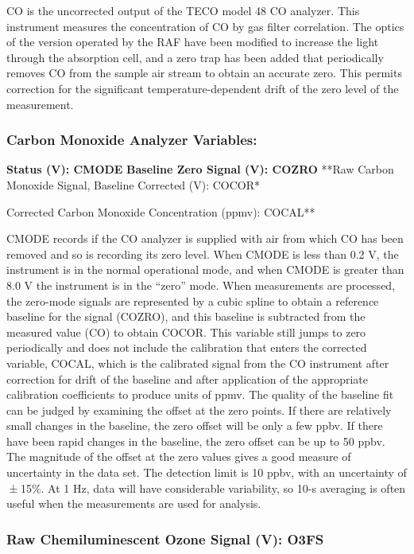 \documentclass[
  english,
]{book}
\begin{document}
CO is the uncorrected output of the TECO model 48 CO analyzer. This
instrument measures the concentration of CO by gas filter correlation.
The optics of the version operated by the RAF have been modified to
increase the light through the absorption cell, and a zero trap has been
added that periodically removes CO from the sample air stream to obtain
an accurate zero. This permits correction for the significant
temperature-dependent drift of the zero level of the measurement.

\hypertarget{co-vars}{%
\subsubsection*{Carbon Monoxide Analyzer Variables:}\label{co-vars}}

\textbf{Status (V): CMODE} \textbf{Baseline Zero Signal (V): COZRO}
**Raw Carbon Monoxide Signal, Baseline Corrected (V): COCOR*

\textbf{ }Corrected Carbon Monoxide Concentration (ppmv): COCAL**

CMODE records if the CO analyzer is supplied with air from which CO has
been removed and so is recording its zero level. When CMODE is less than
0.2 V, the instrument is in the normal operational mode, and when CMODE
is greater than 8.0 V the instrument is in the ``zero'' mode. When
measurements are processed, the zero-mode signals are represented by a
cubic spline to obtain a reference baseline for the signal (COZRO), and
this baseline is subtracted from the measured value (CO) to obtain
COCOR. This variable still jumps to zero periodically and does not
include the calibration that enters the corrected variable, COCAL, which
is the calibrated signal from the CO instrument after correction for
drift of the baseline and after application of the appropriate
calibration coefficients to produce units of ppmv. The quality of the
baseline fit can be judged by examining the offset at the zero points.
If there are relatively small changes in the baseline, the zero offset
will be only a few ppbv. If there have been rapid changes in the
baseline, the zero offset can be up to 50 ppbv. The magnitude of the
offset at the zero values gives a good measure of uncertainty in the
data set. The detection limit is 10 ppbv, with an uncertainty of
{ ± 15\%}. At 1 Hz, data will have considerable variability, so 10-s
averaging is often useful when the measurements are used for analysis.

\hypertarget{o3fs}{%
\subsubsection*{Raw Chemiluminescent Ozone Signal (V):
O3FS}\label{o3fs}}
\end{document}
